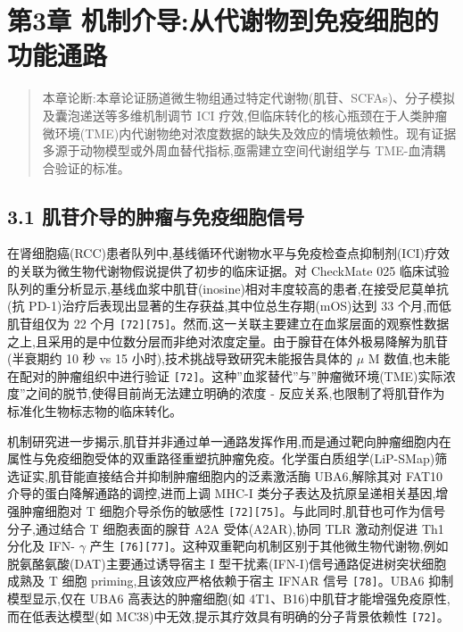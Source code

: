 \documentclass[11pt]{article}
\begin{document}
\section{第3章 机制介导:从代谢物到免疫细胞的功能通路}\label{ux7b2c3ux7ae0-ux673aux5236ux4ecbux5bfcux4eceux4ee3ux8c22ux7269ux5230ux514dux75abux7ec6ux80deux7684ux529fux80fdux901aux8def}

\begin{quote}
本章论断:本章论证肠道微生物组通过特定代谢物(肌苷、SCFAs)、分子模拟及囊泡递送等多维机制调节 ICI 疗效,但临床转化的核心瓶颈在于人类肿瘤微环境(TME)内代谢物绝对浓度数据的缺失及效应的情境依赖性。现有证据多源于动物模型或外周血替代指标,亟需建立空间代谢组学与 TME-血清耦合验证的标准。
\end{quote}

\subsection{3.1 肌苷介导的肿瘤与免疫细胞信号}\label{ux808cux82f7ux4ecbux5bfcux7684ux80bfux7624ux4e0eux514dux75abux7ec6ux80deux4fe1ux53f7}

在肾细胞癌(RCC)患者队列中,基线循环代谢物水平与免疫检查点抑制剂(ICI)疗效的关联为微生物代谢物假说提供了初步的临床证据。对 CheckMate 025 临床试验队列的重分析显示,基线血浆中肌苷(inosine)相对丰度较高的患者,在接受尼莫单抗(抗 PD-1)治疗后表现出显著的生存获益,其中位总生存期(mOS)达到 33 个月,而低肌苷组仅为 22 个月 \texttt{{[}72{]}{[}75{]}}。然而,这一关联主要建立在血浆层面的观察性数据之上,且采用的是中位数分层而非绝对浓度定量。由于腺苷在体外极易降解为肌苷(半衰期约 10 秒 vs 15 小时),技术挑战导致研究未能报告具体的 \(\mu\) M 数值,也未能在配对的肿瘤组织中进行验证 \texttt{{[}72{]}}。这种''血浆替代''与''肿瘤微环境(TME)实际浓度''之间的脱节,使得目前尚无法建立明确的浓度 - 反应关系,也限制了将肌苷作为标准化生物标志物的临床转化。

机制研究进一步揭示,肌苷并非通过单一通路发挥作用,而是通过靶向肿瘤细胞内在属性与免疫细胞受体的双重路径重塑抗肿瘤免疫。化学蛋白质组学(LiP-SMap)筛选证实,肌苷能直接结合并抑制肿瘤细胞内的泛素激活酶 UBA6,解除其对 FAT10 介导的蛋白降解通路的调控,进而上调 MHC-I 类分子表达及抗原呈递相关基因,增强肿瘤细胞对 T 细胞介导杀伤的敏感性 \texttt{{[}72{]}{[}75{]}}。与此同时,肌苷也可作为信号分子,通过结合 T 细胞表面的腺苷 A2A 受体(A2AR),协同 TLR 激动剂促进 Th1 分化及 IFN- \(\gamma\) 产生 \texttt{{[}76{]}{[}77{]}}。这种双重靶向机制区别于其他微生物代谢物,例如脱氨酪氨酸(DAT)主要通过诱导宿主 I 型干扰素(IFN-I)信号通路促进树突状细胞成熟及 T 细胞 priming,且该效应严格依赖于宿主 IFNAR 信号 \texttt{{[}78{]}}。UBA6 抑制模型显示,仅在 UBA6 高表达的肿瘤细胞(如 4T1、B16)中肌苷才能增强免疫原性,而在低表达模型(如 MC38)中无效,提示其疗效具有明确的分子背景依赖性 \texttt{{[}72{]}}。
\end{document}
